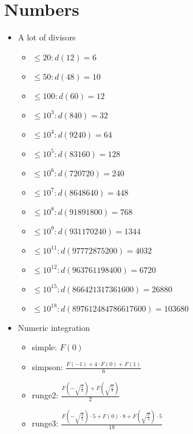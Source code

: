 \section{Numbers}

\begin{itemize}
	\item A lot of divisors
		\begin{itemize}
			\item $\leq 20: d(12)=6$
			\item $\leq 50: d(48)=10$
			\item $\leq 100: d(60)=12$
			\item $\leq 10^3: d(840)=32$
			\item $\leq 10^4: d(9240)=64$
			\item $\leq 10^5: d(83160)=128$
			\item $\leq 10^6: d(720720)=240$
			\item $\leq 10^7: d(8648640)=448$
			\item $\leq 10^8: d(91891800)=768$
			\item $\leq 10^9: d(931170240)=1344$
			\item $\leq 10^{11}: d(97772875200)=4032$
			\item $\leq 10^{12}: d(963761198400)=6720$
			\item $\leq 10^{15}: d(866421317361600)=26880$
			\item $\leq 10^{18}: d(897612484786617600)=103680$
		\end{itemize}

	\item Numeric integration
		\begin{itemize}
			\item simple: $F(0)$
			\item simpson: $\frac{F(-1) + 4 \cdot F(0) + F(1)}{6}$
			\item runge2: $\frac{ F(-\sqrt{\frac{1}{3}}) + F(\sqrt{\frac{1}{3}}) }{2}$
			\item runge3: $\frac{ F(-\sqrt{\frac{3}{5}}) \cdot 5 + F(0) \cdot 8 +  F(\sqrt{\frac{3}{5}}) \cdot 5}{18}$
		\end{itemize}
\end{itemize}	
